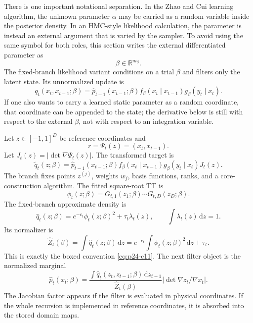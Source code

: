 \documentclass[11pt]{article}
\numberwithin{equation}{section}
\newcommand{\R}{\mathbb R}
\newcommand{\dd}{\,\mathrm d}
\begin{document}
There is one important notational separation.  In the Zhao and Cui \cite{zhao2024ttsequential} learning
algorithm, the unknown parameter \(\alpha\) may be carried as a random variable
inside the posterior density.  In an HMC-style likelihood calculation, the
parameter is instead an external argument that is varied by the sampler.  To
avoid using the same symbol for both roles, this section writes the external
differentiated parameter as
\[
    \beta\in\R^{m_\beta}.
\]
The fixed-branch likelihood variant conditions on a trial \(\beta\) and filters
only the latent state.  Its unnormalized update is
\[
    q_t(x_t,x_{t-1};\beta)
    =
    \widehat p_{t-1}(x_{t-1};\beta)
    f_\beta(x_t\mid x_{t-1})
    g_\beta(y_t\mid x_t).
\]
If one also wants to carry a learned static parameter as a random coordinate,
that coordinate can be appended to the state; the derivative below is still
with respect to the external \(\beta\), not with respect to an integration
variable.

Let \(z\in[-1,1]^D\) be reference coordinates and
\[
    r=\Psi_t(z)=(x_t,x_{t-1}).
\]
Let \(J_t(z)=|\det\nabla\Psi_t(z)|\).  The transformed target is
\begin{equation}
    \widetilde q_t(z;\beta)
    =
    \widehat p_{t-1}(x_{t-1};\beta)
    f_\beta(x_t\mid x_{t-1})
    g_\beta(y_t\mid x_t)
    J_t(z).
    \label{eq:p24-fb1}
\end{equation}
The branch fixes points \(z^{(j)}\), weights \(w_j\), basis functions, ranks,
and a core-construction algorithm.  The fitted square-root TT is
\begin{equation}
    \phi_t(z;\beta)=G_{t,1}(z_1;\beta)\cdots G_{t,D}(z_D;\beta).
    \label{eq:p24-fb2}
\end{equation}
The fixed-branch approximate density is
\begin{equation}
    \widehat q_t(z;\beta)
    =
    e^{-c_t}\phi_t(z;\beta)^2+\tau_t\lambda_t(z),
    \qquad
    \int\lambda_t(z)\dd z=1.
    \label{eq:p24-fb3}
\end{equation}
Its normalizer is
\begin{equation}
    \widehat Z_t(\beta)
    =
    \int\widehat q_t(z;\beta)\dd z
    =
    e^{-c_t}\int\phi_t(z;\beta)^2\dd z+\tau_t.
    \label{eq:p24-fb4}
\end{equation}
This is exactly the boxed convention \eqref{eq:p24-c11}.
The next filter object is the normalized marginal
\begin{equation}
    \widehat p_t(x_t;\beta)
    =
    \frac{
    \int \widehat q_t(z_t,z_{t-1};\beta)\dd z_{t-1}}
    {\widehat Z_t(\beta)}
    \left|\det\nabla z_t/\nabla x_t\right|.
    \label{eq:p24-fb5}
\end{equation}
The Jacobian factor appears if the filter is evaluated in physical coordinates.
If the whole recursion is implemented in reference coordinates, it is absorbed
into the stored domain maps.
\end{document}
